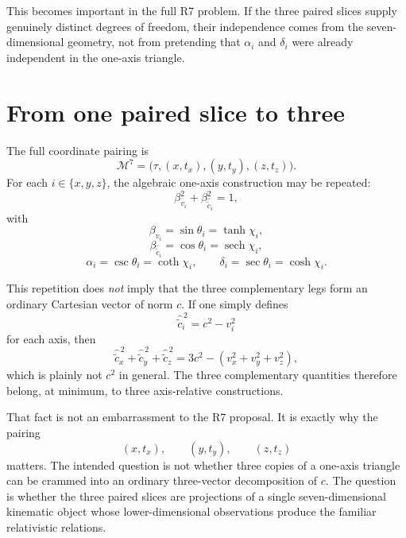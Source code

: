 \documentclass[11pt]{article}
\DeclareMathOperator{\sech}{sech}
\newcommand{\Mseven}{\mathcal{M}^{7}}
\newcommand{\ccomp}[1]{\widehat{\widetilde{c}}_{#1}}
\begin{document}
This becomes important in the full R7 problem. If the three paired slices
supply genuinely distinct degrees of freedom, their independence comes from
the seven-dimensional geometry, not from pretending that $\alpha_i$ and
$\delta_i$ were already independent in the one-axis triangle.

\section{From one paired slice to three}

The full coordinate pairing is
\begin{equation}
\Mseven
=
\bigl(\tau,(x,t_x),(y,t_y),(z,t_z)\bigr).
\end{equation}
For each $i\in\{x,y,z\}$, the algebraic one-axis construction may be repeated:
\begin{equation}
\beta_{v_i}^2+\beta_{\ccomp{i}}^2=1,
\label{eq:three-pair-circles}
\end{equation}
with
\begin{equation}
\beta_{v_i}=\sin\theta_i=\tanh\chi_i,
\label{eq:three-beta}
\end{equation}
\begin{equation}
\beta_{\ccomp{i}}=\cos\theta_i=\sech\chi_i,
\label{eq:three-complement}
\end{equation}
\begin{equation}
\alpha_i=\csc\theta_i=\coth\chi_i,
\qquad
\delta_i=\sec\theta_i=\cosh\chi_i.
\label{eq:three-reciprocal}
\end{equation}

This repetition does \emph{not} imply that the three complementary legs form
an ordinary Cartesian vector of norm $c$. If one simply defines
\begin{equation}
\ccomp{i}^{\,2}=c^2-v_i^2
\end{equation}
for each axis, then
\begin{equation}
\ccomp{x}^{\,2}
+
\ccomp{y}^{\,2}
+
\ccomp{z}^{\,2}
=
3c^2-\left(v_x^2+v_y^2+v_z^2\right),
\label{eq:not-c-vector}
\end{equation}
which is plainly not $c^2$ in general. The three complementary quantities
therefore belong, at minimum, to three axis-relative constructions.

That fact is not an embarrassment to the R7 proposal. It is exactly why the
pairing
\begin{equation}
(x,t_x),\qquad(y,t_y),\qquad(z,t_z)
\end{equation}
matters. The intended question is not whether three copies of a one-axis
triangle can be crammed into an ordinary three-vector decomposition of $c$.
The question is whether the three paired slices are projections of a single
seven-dimensional kinematic object whose lower-dimensional observations
produce the familiar relativistic relations.
\end{document}
